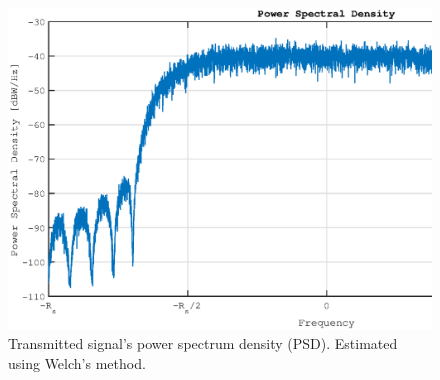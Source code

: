 \documentclass[paper=a4, fontsize=11pt]{scrartcl}	%
\numberwithin{equation}{section}		%
\numberwithin{figure}{section}			%
\numberwithin{table}{section}			%
\begin{document}
\begin{figure}[htb]
\centering
\includegraphics[scale=0.40]{matp_TxPsd.eps}
\caption{Transmitted signal's power spectrum density (PSD). Estimated using Welch's method.}\label{fig:TxPsd}
\end{figure}
\end{document}
